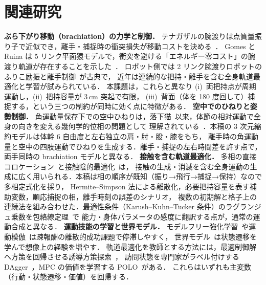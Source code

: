 \section{関連研究}
\label{sec:related}
\noindent\textbf{ぶら下がり移動（brachiation）の力学と制御．}\quad
テナガザルの腕渡りは点質量振り子で近似でき，離手・捕捉時の衝突損失が移動コストを決める~\cite{bertram1999,usherwood2003}．
Gomes と Ruina は 5 リンク平面猿モデルで，衝突を避ける「エネルギー零コスト」の腕渡り軌道が存在することを示した~\cite{gomes2005}．
ロボット側では 2 リンク腕渡りロボットのふりこ励振と離手制御~\cite{saito1994,nakanishi2000}が古典で，
近年は連続的な把持・離手を含む全身軌道最適化と学習が試みられている．
本課題は，これらと異なり (i)~両把持点が周期運動し，(ii)~把持容量が 3\,cm 突起で有限，
(iii)~背面（体を 180 度回して）捕捉する，という三つの制約が同時に効く点に特徴がある．
\noindent\textbf{空中でのひねりと姿勢制御．}\quad
角運動量保存下での空中ひねりは，落下猫~\cite{kane1969}以来，体節の相対運動で全身の向きを変える幾何学的位相の問題として
理解されている~\cite{frohlich1979,yeadon1993}．本稿の 3 次元縮約モデルは体幹 6 自由度と左右独立の肩・肘・股・膝をもち，
離手時の角運動量と空中の四肢運動でひねりを生成する．離手・捕捉の左右時間差を許す点で，両手同時の brachiation モデルと異なる．
\noindent\textbf{接触を含む軌道最適化．}\quad
多相の直接コロケーション~\cite{hargraves1987,betts2010,kelly2017}と接触陰的最適化~\cite{posa2014,mordatch2012}は，
接触の生成・消滅を含む全身運動の生成に広く用いられる．本稿は相の順序が既知（振り→飛行→捕捉→保持）なので多相定式化を採り，
Hermite--Simpson 法による離散化，必要把持容量を表す補助変数，順応捕捉の相，離手時刻の誤差のシナリオ，
複数の初期解と格子上の連続法を組み合わせた．最適性条件（Karush--Kuhn--Tucker 条件）のラグランジュ乗数を包絡線定理~\cite{fiacco1976,buskens2001}で
能力・身体パラメータの感度に翻訳する点が，通常の運動合成と異なる．
\noindent\textbf{運動技能の学習と世界モデル．}\quad
モデルフリー強化学習~\cite{haarnoja2018}や運動模倣~\cite{peng2018}は疎報酬の離散的成功課題で停滞しやすく，
世界モデル~\cite{ha2018,hafner2020,hafner2025,hansen2022}は状態遷移を学んで想像上の経験を増やす．
軌道最適化を教師とする方法には，最適制御解へ方策を回帰させる誘導方策探索~\cite{levine2013}，
訪問状態を専門家がラベル付けする DAgger~\cite{ross2011}，MPC の価値を学習する POLO~\cite{lowrey2019}がある．
これらはいずれも主変数（行動・状態遷移・価値）を回帰する．
